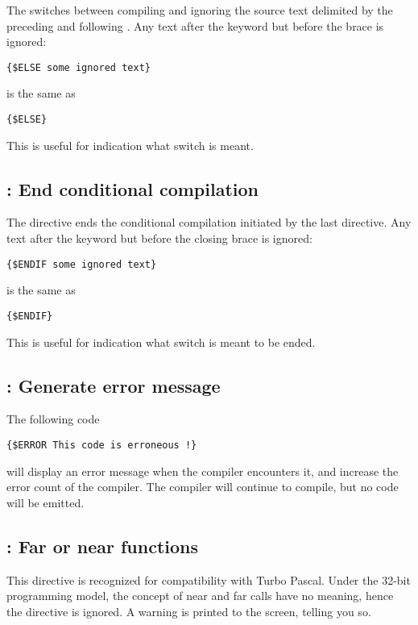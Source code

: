 The  switches between compiling and ignoring the source
text delimited by the preceding  and following
. Any text after the  keyword but before the
brace is ignored:
\begin{verbatim}
{$ELSE some ignored text}
\end{verbatim}
is the same as
\begin{verbatim}
{$ELSE}
\end{verbatim}
This is useful for indication what switch is meant.

\subsection{ : End conditional compilation}

The  directive ends the conditional compilation initiated by the
last  directive. Any text after the  keyword but
before the closing brace is ignored:
\begin{verbatim}
{$ENDIF some ignored text}
\end{verbatim}
is the same as
\begin{verbatim}
{$ENDIF}
\end{verbatim}
This is useful for indication what switch is meant to be ended.

\subsection{ : Generate error message}

The following code
\begin{verbatim}
{$ERROR This code is erroneous !}
\end{verbatim}
will display an error message when the compiler encounters it,
and increase the error count of the compiler.
The compiler will continue to compile, but no code will be emitted.

\subsection{ : Far or near functions}
This directive is recognized for compatibility with Turbo Pascal. Under the
32-bit programming model, the concept of near and far calls have no meaning,
hence the directive is ignored. A warning is printed to the screen, telling
you so.

